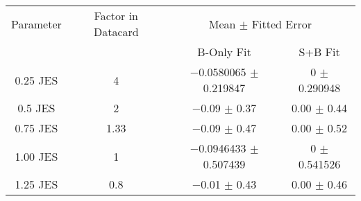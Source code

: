 \begin{scriptsize}
\begin{table}
\centering
\begin{tabular}{cccc}
\toprule
Parameter & Factor in Datacard & \multicolumn{2}{c}{{Mean $\pm$ Fitted Error}}\\
 & & {B-Only Fit} & {S+B Fit}\\
\midrule
\num[round-precision=2]{0.25} JES & 4 & \num{-0.0580065} $\pm$ \num{0.219847} & \num{0} $\pm$ \num{0.290948}\\
\num[round-precision=2]{0.5} JES & 2 & \num{-0.09} $\pm$ \num{0.37} & \num{+0.00} $\pm$ \num{0.44}\\
\num[round-precision=2]{0.75} JES & \num[round-precision=2]{1.33} & \num{-0.09} $\pm$ \num{0.47} & \num{+0.00} $\pm$ \num{0.52}\\
\num[round-precision=2]{1.00} JES & 1 & \num{-0.0946433} $\pm$ \num{0.507439} & \num{0} $\pm$ \num{0.541526}\\
\num[round-precision=2]{1.25} JES & \num[round-precision=2]{0.8} & \num{-0.01} $\pm$ \num{0.43} & \num{+0.00} $\pm$ \num{0.46}\\
\bottomrule
\end{tabular}
\end{table}
\end{scriptsize}
